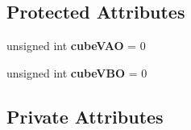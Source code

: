 \subsection*{Protected Attributes}
\begin{DoxyCompactItemize}
\item 
unsigned int {\bfseries cube\+V\+AO} = 0\hypertarget{class_cube_map_aad4e977cb96f73cce4211d82ae9995c1}{}\label{class_cube_map_aad4e977cb96f73cce4211d82ae9995c1}

\item 
unsigned int {\bfseries cube\+V\+BO} = 0\hypertarget{class_cube_map_a035827269959a847c98183befca029aa}{}\label{class_cube_map_a035827269959a847c98183befca029aa}

\end{DoxyCompactItemize}
\subsection*{Private Attributes}
